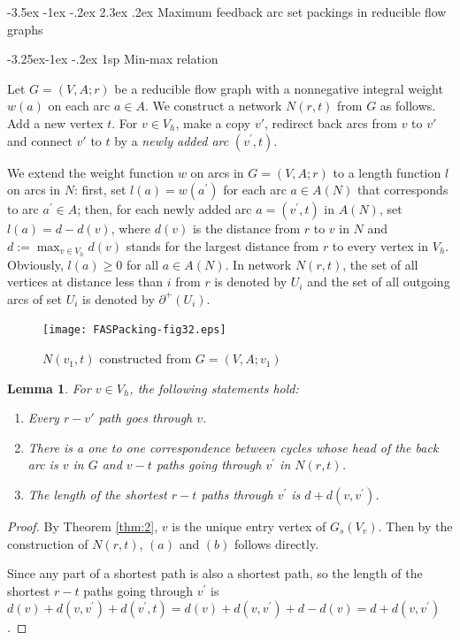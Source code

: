\documentclass[11pt]{article}
\makeatletter
\newtheorem{lemma}[theorem]{Lemma}
\renewcommand\section{%
  \@startsection{section}{1}
                {\z@}%
                {-3.5ex \@plus -1ex \@minus -.2ex}%
                {2.3ex \@plus.2ex}%
                {\large\bfseries}%
}
\renewcommand\subsection{%
  \@startsection{subsection}{2}
                {\z@}%
                {-3.25ex\@plus -1ex \@minus -.2ex}%
                {1sp}%
                {\normalsize\bfseries}%
}
\makeatother
\begin{document}
\section{Maximum feedback arc set packings in reducible flow graphs}
\label{sec:3}

\subsection{Min-max relation}
\label{sec:4}

Let $G=(V,A;r)$ be a reducible flow graph with a nonnegative integral weight $w(a)$ on each arc $a\in A$. We construct a network $N(r,t)$ from $G$ as follows. Add a new vertex $t$. For $v\in V_h$, make a copy $v'$, redirect back arcs from $v$ to $v'$ and connect $v'$ to $t$ by a \emph{newly added arc} $(v^\prime,t)$. 

We extend the weight function $w$ on arcs in $G=(V,A;r)$ to a length function $l$ on arcs in $N$: first, set $l(a)=w(a^\prime)$ for each arc $a\in A(N)$ that corresponds to arc $a^\prime\in A$; then, for each newly added arc $a=(v^\prime,t)$ in $A(N)$, set $l(a)=d-d(v)$, where $d(v)$ is the distance from $r$ to $v$ in $N$ and $d:=\max_{v\in V_h} d(v)$ stands for the largest distance from $r$ to every vertex in $V_h$. Obviously, $l(a)\geq 0$ for all $a\in A(N)$. In network $N(r,t)$, the set of all vertices at distance less than $i$ from $r$ is denoted by $U_i$ and the set of all outgoing arcs of set $U_i$ is denoted by $\partial^+(U_i)$.

\begin{figure}
    \centering
    \texttt{[image: FASPacking-fig32.eps]}
    \caption{$N(v_1,t)$ constructed from $G=(V,A;v_1)$}
     \label{fig:3}
 \end{figure}

\begin{lemma}
\label{lem:2}
For $v\in V_h$, the following statements hold:
\begin{enumerate}[label=\emph{(}\alph*\emph{)}]
  \item Every $r-v'$ path goes through $v$.
  \item There is a one to one correspondence between cycles whose head of the back arc is $v$ in $G$ and $v-t$ paths going through $v^\prime$ in $N(r,t)$. 
  \item The length of the shortest $r-t$ paths through $v^\prime$ is $d+d(v,v^\prime)$.
\end{enumerate}
\end{lemma}
\begin{proof}
By Theorem \ref{thm:2}, $v$ is the unique entry vertex of $G_s(V_v)$. Then by the construction of $N(r,t)$, $(a)$ and $(b)$ follows directly.

Since any part of a shortest path is also a shortest path, so the length of the shortest $r-t$ paths going through $v^\prime$ is $d(v)+d(v,v^\prime)+d(v^\prime,t)=d(v)+d(v,v^\prime)+d-d(v)=d+d(v,v^\prime)$.
\end{proof}
\end{document}
